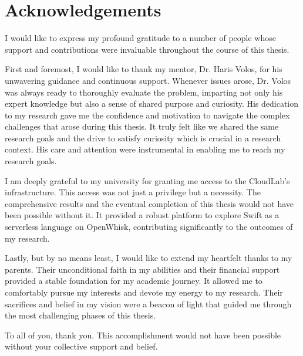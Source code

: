 \chapter*{Acknowledgements}

I would like to express my profound gratitude to a number of people whose support and contributions were invaluable throughout the course of this thesis.

First and foremost, I would like to thank my mentor, Dr. Haris Volos, for his unwavering guidance and continuous support. Whenever issues arose, Dr. Volos was always ready to thoroughly evaluate the problem, imparting not only his expert knowledge but also a sense of shared purpose and curiosity. His dedication to my research gave me the confidence and motivation to navigate the complex challenges that arose during this thesis. It truly felt like we shared the same research goals and the drive to satisfy curiosity which is crucial in a research context. His care and attention were instrumental in enabling me to reach my research goals.

I am deeply grateful to my university for granting me access to the CloudLab's infrastructure. This access was not just a privilege but a necessity. The comprehensive results and the eventual completion of this thesis would not have been possible without it. It provided a robust platform to explore Swift as a serverless language on OpenWhisk, contributing significantly to the outcomes of my research.

Lastly, but by no means least, I would like to extend my heartfelt thanks to my parents. Their unconditional faith in my abilities and their financial support provided a stable foundation for my academic journey. It allowed me to comfortably pursue my interests and devote my energy to my research. Their sacrifices and belief in my vision were a beacon of light that guided me through the most challenging phases of this thesis.

To all of you, thank you. This accomplishment would not have been possible without your collective support and belief.

